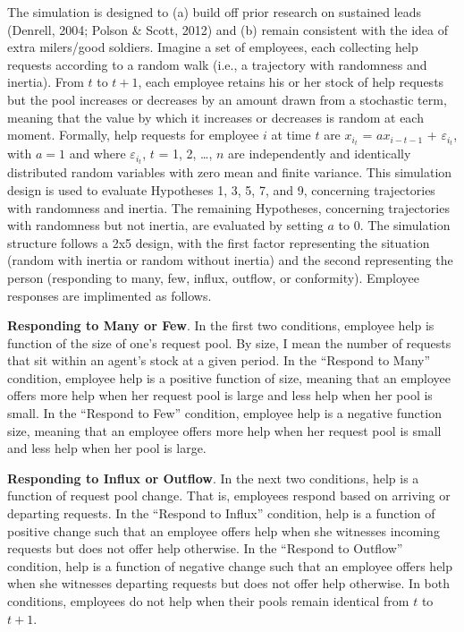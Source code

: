 \documentclass[english,,man]{apa6}
\begin{document}
The simulation is designed to (a) build off prior research on sustained leads (Denrell, 2004; Polson \& Scott, 2012) and (b) remain consistent with the idea of extra milers/good soldiers. Imagine a set of employees, each collecting help requests according to a random walk (i.e., a trajectory with randomness and inertia). From \(t\) to \(t + 1\), each employee retains his or her stock of help requests but the pool increases or decreases by an amount drawn from a stochastic term, meaning that the value by which it increases or decreases is random at each moment. Formally, help requests for employee \(i\) at time \(t\) are \(x_{i_t}\) = \(ax_{i-{t-1}}\) + \(\varepsilon_{i_t}\), with \(a = 1\) and where \(\varepsilon_{i_t}\), \(t\) = 1, 2, \ldots{}, \(n\) are independently and identically distributed random variables with zero mean and finite variance. This simulation design is used to evaluate Hypotheses 1, 3, 5, 7, and 9, concerning trajectories with randomness and inertia. The remaining Hypotheses, concerning trajectories with randomness but not inertia, are evaluated by setting \(a\) to 0. The simulation structure follows a 2x5 design, with the first factor representing the situation (random with inertia or random without inertia) and the second representing the person (responding to many, few, influx, outflow, or conformity). Employee responses are implimented as follows.

\textbf{Responding to Many or Few}. In the first two conditions, employee help is function of the size of one's request pool. By size, I mean the number of requests that sit within an agent's stock at a given period. In the \enquote{Respond to Many} condition, employee help is a positive function of size, meaning that an employee offers more help when her request pool is large and less help when her pool is small. In the \enquote{Respond to Few} condition, employee help is a negative function size, meaning that an employee offers more help when her request pool is small and less help when her pool is large.

\textbf{Responding to Influx or Outflow}. In the next two conditions, help is a function of request pool change. That is, employees respond based on arriving or departing requests. In the \enquote{Respond to Influx} condition, help is a function of positive change such that an employee offers help when she witnesses incoming requests but does not offer help otherwise. In the \enquote{Respond to Outflow} condition, help is a function of negative change such that an employee offers help when she witnesses departing requests but does not offer help otherwise. In both conditions, employees do not help when their pools remain identical from \(t\) to \(t + 1\).
\end{document}
